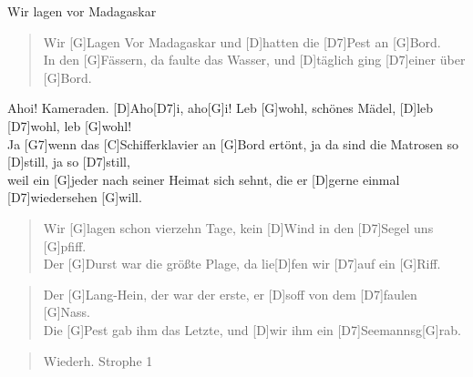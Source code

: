 \begin{song}{Wir lagen vor Madagaskar}{}

    \begin{verse}  
        Wir [G]Lagen Vor Madagaskar und [D]hatten die [D7]Pest an [G]Bord. \\
        In den [G]Fässern, da faulte das Wasser, und [D]täglich ging [D7]einer über [G]Bord.
    \end{verse}  

    \begin{chorus}
        [G]Ahoi! Kameraden. [D]Aho[D7]i, aho[G]i! Leb [G]wohl, schönes Mädel, [D]leb [D7]wohl, leb
        [G]wohl! \\
        Ja [G7]wenn das [C]Schifferklavier an [G]Bord ertönt, ja da sind die Matrosen so [D]still,
        ja so [D7]still, \\
        weil ein [G]jeder nach seiner Heimat sich sehnt, die er [D]gerne einmal [D7]wiedersehen [G]will.
    \end{chorus}

    \begin{verse}  
        Wir [G]lagen schon vierzehn Tage, kein [D]Wind in den [D7]Segel uns [G]pfiff. \\
        Der [G]Durst war die größte Plage, da lie[D]fen wir [D7]auf ein [G]Riff.
    \end{verse}  


    \begin{verse}  
        Der [G]Lang-Hein, der war der erste, er [D]soff von dem [D7]faulen [G]Nass. \\
        Die [G]Pest gab ihm das Letzte, und [D]wir ihm ein [D7]Seemannsg[G]rab.
    \end{verse}  


    \begin{verse}  
        Wiederh. Strophe 1 %
    \end{verse}  


\end{song}
